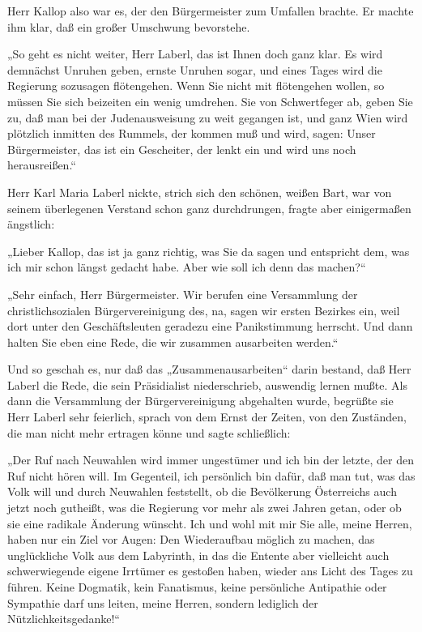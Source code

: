 Herr Kallop also war es, der den Bürgermeister zum Umfallen
brachte. Er machte ihm klar, daß ein großer Umschwung bevorstehe.

„So geht es nicht weiter, Herr Laberl, das ist Ihnen doch ganz
klar. Es wird demnächst Unruhen geben, ernste 
Unruhen sogar, und eines Tages wird die Regierung sozusagen
flötengehen. Wenn Sie nicht mit flötengehen wollen, so müssen Sie
sich beizeiten ein wenig umdrehen. 
 Sie von Schwertfeger ab,
geben Sie zu, daß man bei der Judenausweisung zu weit gegangen ist,
und ganz Wien wird plötzlich inmitten des Rummels, der kommen muß
und wird, sagen: Unser Bürgermeister, das ist ein Gescheiter, der
lenkt ein und wird uns noch herausreißen.“

Herr Karl Maria Laberl nickte, strich sich den schönen, weißen
Bart, war von seinem überlegenen Verstand schon ganz durchdrungen,
fragte aber einigermaßen ängstlich:

„Lieber Kallop, das ist ja ganz richtig, was Sie da sagen und
entspricht dem, was ich mir schon längst gedacht habe. Aber wie
soll ich denn das machen?“

„Sehr einfach, Herr Bürgermeister. Wir berufen eine Versammlung der
christlichsozialen Bürgervereinigung des, na, sagen wir ersten
Bezirkes ein, weil dort unter den Geschäftsleuten geradezu eine
Panikstimmung herrscht. Und dann halten Sie eben eine Rede, die wir
zusammen ausarbeiten werden.“

Und so geschah es, nur daß das „Zusammenausarbeiten“ darin bestand,
daß Herr Laberl die Rede, die sein Präsidialist niederschrieb,
auswendig lernen mußte. Als dann die Versammlung der
Bürgervereinigung abgehalten wurde, begrüßte sie Herr Laberl sehr
feierlich, sprach von dem Ernst der Zeiten, von den Zuständen, die
man nicht mehr ertragen könne und sagte schließlich:

„Der Ruf nach Neuwahlen wird immer ungestümer und ich bin der
letzte, der den Ruf nicht hören will. Im 
Gegenteil, ich persönlich bin dafür, daß man tut, was das Volk will
und durch Neuwahlen feststellt, ob die Bevölkerung Österreichs
auch jetzt noch gutheißt, was die Regierung vor mehr als zwei
Jahren getan, oder ob sie eine radikale Änderung wünscht. Ich und
wohl mit mir Sie alle, meine Herren, haben nur ein Ziel vor Augen:
Den Wiederaufbau möglich zu machen, das unglückliche Volk aus dem
Labyrinth, in das die Entente aber vielleicht auch schwerwiegende
eigene Irrtümer es gestoßen haben, wieder ans Licht des Tages zu
führen. Keine Dogmatik, kein Fanatismus, keine persönliche
Antipathie oder Sympathie darf uns leiten, meine Herren, sondern
lediglich der Nützlichkeitsgedanke!“

